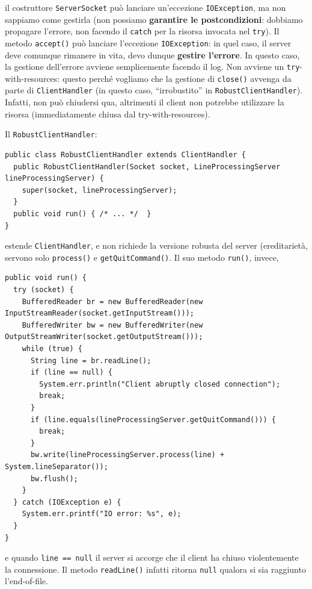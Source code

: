 \documentclass[\fontsizeclass,twocolumn]{\classname}
\theoremstyle{definition}
\theoremstyle{definition}
\begin{document}
il costruttore \texttt{ServerSocket} può lanciare un'eccezione
\texttt{IOException}, ma non sappiamo come gestirla (non possiamo
\textbf{garantire le postcondizioni}: dobbiamo propagare l'errore, non facendo
il \texttt{catch} per la risorsa invocata nel \texttt{try}). Il metodo
\texttt{ac\-cept()} può lanciare l'eccezione \texttt{IOException}: in quel caso,
il server deve comunque rimanere in vita, devo dunque \textbf{gestire
l'errore}. In questo caso, la gestione dell'errore avviene semplicemente
facendo il log. Non avviene un \texttt{try}-with-resources: questo perché
vogliamo che la gestione di \texttt{close()} avvenga da parte di
\texttt{ClientHandler} (in questo caso, ``irrobustito'' in
\texttt{RobustClientHandler}). Infatti, non può chiudersi qua, altrimenti il
client non potrebbe utilizzare la risorsa (immediatamente chiusa dal
try-with-resources).

Il \texttt{RobustClientHandler}:

\begin{lstlisting}
public class RobustClientHandler extends ClientHandler {
  public RobustClientHandler(Socket socket, LineProcessingServer lineProcessingServer) {
    super(socket, lineProcessingServer);
  }
  public void run() { /* ... */  }
}
\end{lstlisting}

estende \texttt{ClientHandler}, e non richiede la versione robusta del server
(ereditarietà, servono solo \texttt{process()} e \texttt{getQuitCommand()}. Il
suo metodo \texttt{run()}, invece,

\begin{lstlisting}
public void run() {
  try (socket) {
    BufferedReader br = new BufferedReader(new InputStreamReader(socket.getInputStream()));
    BufferedWriter bw = new BufferedWriter(new OutputStreamWriter(socket.getOutputStream()));
    while (true) {
      String line = br.readLine();
      if (line == null) {
        System.err.println("Client abruptly closed connection");
        break;
      }
      if (line.equals(lineProcessingServer.getQuitCommand())) {
        break;
      }
      bw.write(lineProcessingServer.process(line) + System.lineSeparator());
      bw.flush();
    }
  } catch (IOException e) {
    System.err.printf("IO error: %s", e);
  }
}
\end{lstlisting}

e quando \texttt{line == null} il server si accorge che il client ha chiuso
violentemente la connessione. Il metodo \texttt{readLine()} infatti ritorna
\texttt{null} qualora si sia raggiunto l'end-of-file.
\end{document}
